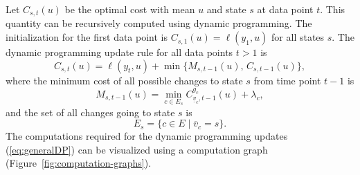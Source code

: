 \documentclass[article]{jss}
\begin{document}
Let $C_{s,t}(u)$ be the optimal cost with mean $u$ and state $s$ at
data point $t$. This quantity can be recursively computed using
dynamic programming. The initialization for the first data point is
$ C_{s,1}(u) = \ell(y_1, u)$ for all states $s$. The dynamic
programming update rule for all data points $t>1$ is
\begin{equation}
\label{eq:generalDP}
   C_{s,t}(u) = \ell(y_t, u) + \min\{
   M_{s,t-1}(u),\,  C_{s,t-1}(u)
  \},
\end{equation}
where the minimum cost of all possible changes to state $s$ from time
point $t-1$ is
\begin{equation}
  M_{s,t-1}(u) = \min_{c\in E_s} C^{g_c}_{\underline v_c, t-1}(u) + \lambda_c,
\end{equation}
and the set of all changes going to state $s$ is
\begin{equation}
  E_s = \{c\in E \mid \overline v_c = s\}.
\end{equation}
The computations required for the dynamic programming updates
(\ref{eq:generalDP}) can be visualized using a computation graph
(Figure~\ref{fig:computation-graphs}).
\end{document}
